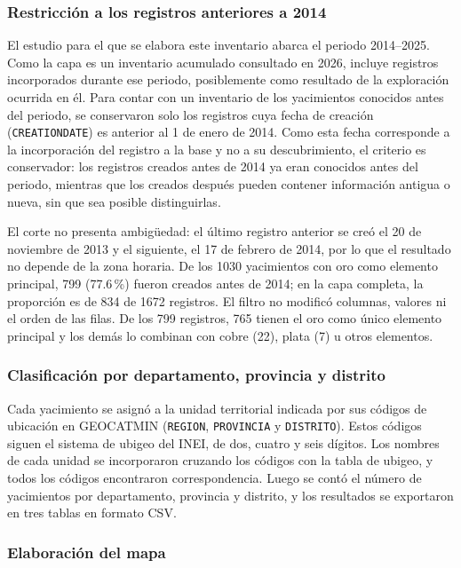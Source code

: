 \documentclass[man,12pt,a4paper,floatsintext,donotrepeattitle]{apa7}
\begin{document}
\subsubsection{Restricción a los registros anteriores a 2014}

El estudio para el que se elabora este inventario abarca el periodo 2014--2025.
Como la capa es un inventario acumulado consultado en 2026, incluye registros
incorporados durante ese periodo, posiblemente como resultado de la exploración
ocurrida en él. Para contar con un inventario de los yacimientos conocidos antes
del periodo, se conservaron solo los registros cuya fecha de creación
(\texttt{CREATIONDATE}) es anterior al 1 de enero de 2014. Como esta fecha
corresponde a la incorporación del registro a la base y no a su descubrimiento,
el criterio es conservador: los registros creados antes de 2014 ya eran
conocidos antes del periodo, mientras que los creados después pueden contener
información antigua o nueva, sin que sea posible distinguirlas.

El corte no presenta ambigüedad: el último registro anterior se creó el 20 de
noviembre de 2013 y el siguiente, el 17 de febrero de 2014, por lo que el
resultado no depende de la zona horaria. De los 1030 yacimientos con oro como
elemento principal, 799 (77.6\,\%) fueron creados antes de 2014; en la capa
completa, la proporción es de 834 de 1672 registros. El filtro no modificó
columnas, valores ni el orden de las filas. De los 799 registros, 765 tienen el
oro como único elemento principal y los demás lo combinan con cobre (22), plata
(7) u otros elementos.

\subsubsection{Clasificación por departamento, provincia y distrito}

Cada yacimiento se asignó a la unidad territorial indicada por sus códigos de
ubicación en GEOCATMIN (\texttt{REGION}, \texttt{PROVINCIA} y
\texttt{DISTRITO}). Estos códigos siguen el sistema de ubigeo del INEI, de dos,
cuatro y seis dígitos. Los nombres de cada unidad se incorporaron cruzando los
códigos con la tabla de ubigeo, y todos los códigos encontraron correspondencia.
Luego se contó el número de yacimientos por departamento, provincia y distrito, y
los resultados se exportaron en tres tablas en formato CSV.

\subsubsection{Elaboración del mapa}
\end{document}
